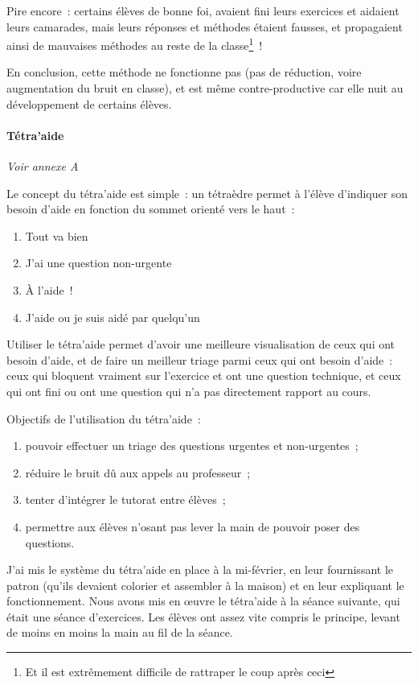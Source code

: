 Pire encore : certains élèves de bonne foi, avaient fini leurs exercices et aidaient
leurs camarades, mais leurs réponses et méthodes étaient fausses, et propagaient
ainsi de mauvaises méthodes au reste de la classe\footnote{Et il est extrêmement difficile de
rattraper le coup après ceci} !

En conclusion, cette méthode ne fonctionne pas (pas de réduction, voire augmentation
du bruit en classe), et est même contre-productive car elle nuit au développement
de certains élèves.

\paragraph{Tétra'aide}

\textit{Voir annexe A}

Le concept du tétra'aide est simple : un tétraèdre permet à l'élève d'indiquer
son besoin d'aide en fonction du sommet orienté vers le haut :
\begin{enumerate}
    \item Tout va bien
    \item J'ai une question non-urgente
    \item À l'aide !
    \item J'aide ou je suis aidé par quelqu'un
\end{enumerate}

Utiliser le tétra'aide permet d'avoir une meilleure visualisation de ceux qui ont
besoin d'aide, et de faire un meilleur triage parmi ceux qui ont besoin d'aide :
ceux qui bloquent vraiment sur l'exercice et ont une question technique, et ceux
qui ont fini ou ont une question qui n'a pas directement rapport au cours.

Objectifs de l'utilisation du tétra'aide :
\begin{enumerate}
    \item pouvoir effectuer un triage des questions urgentes et non-urgentes ;
    \item réduire le bruit dû aux appels au professeur ;
    \item tenter d'intégrer le tutorat entre élèves ;
    \item permettre aux élèves n'osant pas lever la main de pouvoir poser des questions.
\end{enumerate}

J'ai mis le système du tétra'aide en place à la mi-février, en leur fournissant
le patron (qu'ils devaient colorier et assembler à la maison) et en leur expliquant
le fonctionnement. Nous avons mis en œuvre le tétra'aide à la séance suivante,
qui était une séance d'exercices. Les élèves ont assez vite compris le principe,
levant de moins en moins la main au fil de la séance.

